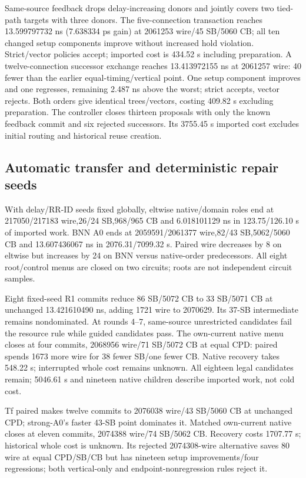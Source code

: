 \documentclass[conference,10pt]{IEEEtran}
\begin{document}
Same-source feedback drops delay-increasing donors and jointly covers two tied-path targets with three donors. The five-connection transaction reaches 13.599797732 ns (7.638334 ps gain) at 2061253 wire/45 SB/5060 CB; all ten changed setup components improve without increased hold violation. Strict/vector policies accept; imported cost is 434.52 s including preparation. A twelve-connection successor exchange reaches 13.413972155 ns at 2061257 wire: 40 fewer than the earlier equal-timing/vertical point. One setup component improves and one regresses, remaining 2.487 ns above the worst; strict accepts, vector rejects. Both orders give identical trees/vectors, costing 409.82 s excluding preparation. The controller closes thirteen proposals with only the known feedback commit and six rejected successors. Its 3755.45 s imported cost excludes initial routing and historical reuse creation.

\subsection{Automatic transfer and deterministic repair seeds}
With delay/RR-ID seeds fixed globally, eltwise native/domain roles end at 217050/217183 wire,26/24 SB,968/965 CB and 6.018101129 ns in 123.75/126.10 s of imported work. BNN A0 ends at 2059591/2061377 wire,82/43 SB,5062/5060 CB and 13.607436067 ns in 2076.31/7099.32 s. Paired wire decreases by 8 on eltwise but increases by 24 on BNN versus native-order predecessors. All eight root/control menus are closed on two circuits; roots are not independent circuit samples.

Eight fixed-seed R1 commits reduce 86 SB/5072 CB to 33 SB/5071 CB at unchanged 13.421610490 ns, adding 1721 wire to 2070629. Its 37-SB intermediate remains nondominated. At rounds 4--7, same-source unrestricted candidates fail the resource rule while guided candidates pass. The own-current native menu closes at four commits, 2068956 wire/71 SB/5072 CB at equal CPD: paired spends 1673 more wire for 38 fewer SB/one fewer CB. Native recovery takes 548.22 s; interrupted whole cost remains unknown. All eighteen legal candidates remain; 5046.61 s and nineteen native children describe imported work, not cold cost.

Tf paired makes twelve commits to 2076038 wire/43 SB/5060 CB at unchanged CPD; strong-A0's faster 43-SB point dominates it. Matched own-current native closes at eleven commits, 2074388 wire/74 SB/5062 CB. Recovery costs 1707.77 s; historical whole cost is unknown. Its rejected 2074308-wire alternative saves 80 wire at equal CPD/SB/CB but has nineteen setup improvements/four regressions; both vertical-only and endpoint-nonregression rules reject it.
\end{document}
